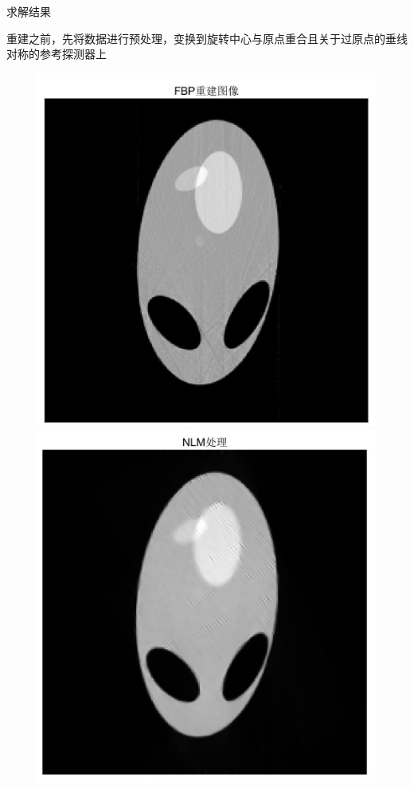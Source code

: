 \documentclass{beamer}
\begin{document}
\begin{frame}{求解结果}
	  
	\small 重建之前，先将数据进行预处理，变换到旋转中心与原点重合且关于过原点的垂线对称的参考探测器上\\
	  
	\begin{figure}[H]
		\begin{minipage}[H]{0.5\textwidth}
		\centering
		\includegraphics[width=\textwidth]{./pic/P2_FBP.jpg}
		\end{minipage}
		\begin{minipage}[H]{0.5\textwidth}
		\centering
		\includegraphics[width=\textwidth]{./pic/P2-ART-5-NLM.jpg}

\end{minipage}
\end{figure}
\end{frame}
\end{document}
